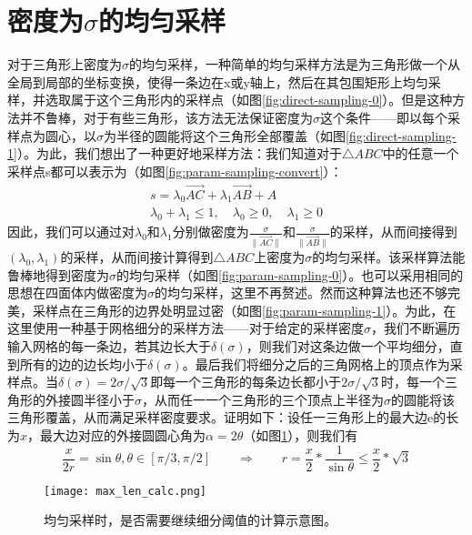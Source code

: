 \section{密度为$\sigma$的均匀采样}
对于三角形上密度为$\sigma$的均匀采样，一种简单的均匀采样方法是为三角形做一个从全局到局部的坐标变换，使得一条边在x或y轴上，然后在其包围矩形上均匀采样，并选取属于这个三角形内的采样点（如图\ref{fig:direct-sampling-0}）。但是这种方法并不鲁棒，对于有些三角形，该方法无法保证密度为$\sigma$这个条件——即以每个采样点为圆心，以$\sigma$为半径的圆能将这个三角形全部覆盖（如图\ref{fig:direct-sampling-1}）。为此，我们想出了一种更好地采样方法：我们知道对于$\triangle ABC$中的任意一个采样点s都可以表示为（如图\ref{fig:param-sampling-convert}）：
\begin{equation}
  \begin{split}
    s = \lambda_0 \overrightarrow{AC}+\lambda_1 \overrightarrow{AB} + A\\
    \lambda_0 + \lambda_1 \leq 1, \quad \lambda_0 \geq 0, \quad \lambda_1 \geq 0
  \end{split}
\end{equation}
因此，我们可以通过对$\lambda_0$和$\lambda_1$分别做密度为$\frac{\sigma}{\parallel \overrightarrow{AC} \parallel}$和$\frac{\sigma}{\parallel \overrightarrow{AB} \parallel}$的采样，从而间接得到$(\lambda_0,\lambda_1)$的采样，从而间接计算得到$\triangle ABC$上密度为$\sigma$的均匀采样。该采样算法能鲁棒地得到密度为$\sigma$的均匀采样（如图\ref{fig:param-sampling-0}）。也可以采用相同的思想在四面体内做密度为$\sigma$的均匀采样，这里不再赘述。然而这种算法也还不够完美，采样点在三角形的边界处明显过密（如图\ref{fig:param-sampling-1}）。为此，在这里使用一种基于网格细分的采样方法——对于给定的采样密度$\sigma$，我们不断遍历输入网格的每一条边，若其边长大于$\delta(\sigma)$，则我们对这条边做一个平均细分，直到所有的边的边长均小于$\delta(\sigma)$。最后我们将细分之后的三角网格上的顶点作为采样点。当$\delta(\sigma)=2\sigma/\sqrt{3}$即每一个三角形的每条边长都小于$2\sigma/\sqrt{3}$时，每一个三角形的外接圆半径小于$\sigma$，从而任一一个三角形的三个顶点上半径为$\sigma$的圆能将该三角形覆盖，从而满足采样密度要求。证明如下：设任一三角形上的最大边e的长为$x$，最大边对应的外接圆圆心角为$\alpha = 2\theta$（如图\ref{fig:max-len-calc}），则我们有
\begin{equation}
  \frac{x}{2r} = \sin\theta, \theta \in [\pi/3, \pi/2] \qquad
  \Rightarrow \qquad r =\frac{x}{2} * \frac{1}{\sin \theta} \leq \frac{x}{2} * \sqrt{3}
\end{equation}

\begin{figure}[htbp]
  \centering
  \texttt{[image: max\_len\_calc.png]}
  \caption[均匀采样细分阈值]{均匀采样时，是否需要继续细分阈值的计算示意图。}
  \label{fig:max-len-calc}
\end{figure}

